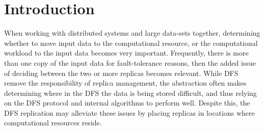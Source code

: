 \documentclass{rspublic}
\newcommand{\jhanote}[1]{ {\textcolor{red} { ***Jha: #1 }}}
\newcommand{\jhanote}[1]{}
\begin{document}
\section{Introduction} When working with distributed systems and large
data-sets together, determining whether to move input data to the
computational resource, or the computational workload to the input data
becomes very important. Frequently, there is more than one copy of the
input data for fault-tolerance reasons, then the added issue of deciding
between the two or more replicas becomes relevant. While DFS remove the
responsibility of replica management, the abstraction often makes
determining where in the DFS the data is being stored difficult, and
thus relying on the DFS protocol and internal algorithms to perform
well. Despite this, the DFS replication may alleviate these issues by
placing replicas in locations where computational resources reside.

\end{document}
